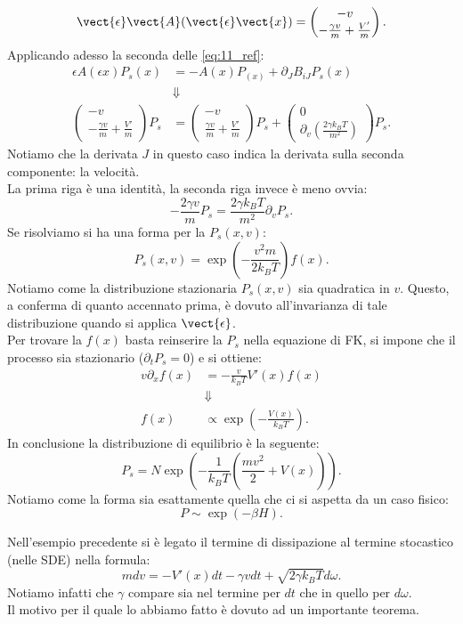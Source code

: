 \begin{exmp}[]
   \[
       \vect{\epsilon}\vect{ A}(\vect{\epsilon}\vect{x})   = \begin{pmatrix} -v \\ -\frac{\gamma v}{m} + \frac{V'}{m} \end{pmatrix} 
   .\] 
   Applicando adesso la seconda delle \ref{eq:11_ref}:
   \[\begin{aligned}
       \epsilon A(\epsilon x) P_s(x) &= - A(x) P_(x) + \partial_{J}B_{iJ}P_s(x) \\
				   & \Downarrow\\
       \begin{pmatrix} -v \\ -\frac{\gamma v}{m} + \frac{V'}{m} \end{pmatrix} P_s &= 
       \begin{pmatrix} -v \\ \frac{\gamma v}{m}+\frac{V'}{m} \end{pmatrix} P_s + 
       \begin{pmatrix} 0 \\ \partial_{v}\left(\frac{2\gamma k_BT}{m^2}\right) \end{pmatrix} P_s
   .\end{aligned}\]
   Notiamo che la derivata $J$ in questo caso indica la derivata sulla seconda componente: la velocità.\\
   La prima riga è una identità, la seconda riga invece è meno ovvia:
   \[
       -\frac{2\gamma v}{m}P_s = \frac{2\gamma k_BT}{m^2}\partial_{v}P_s
   .\] 
   Se risolviamo si ha una forma per la $P_s(x, v)$:
   \[
       P_s(x,v) = \exp\left(-\frac{v^2m}{2k_BT}\right)f(x) 
   .\] 
   Notiamo come la distribuzione stazionaria $P_s(x,v) $ sia quadratica in $v$.
   Questo, a conferma di quanto accennato prima, è dovuto all'invarianza di tale distribuzione quando si applica $\vect{\epsilon }$. \\
   Per trovare la $f(x) $ basta reinserire la $P_s$ nella equazione di FK,  si impone che il processo sia stazionario ($\partial_{t}P_s = 0$) e si ottiene:
   \[\begin{aligned}
       v\partial_{x}f(x) &= - \frac{v}{k_BT}V'(x) f(x) \\
			 &\Downarrow\\
       f(x) &\propto \exp\left(-\frac{V(x)}{k_BT}\right)
   .\end{aligned}\]
   In conclusione la distribuzione di equilibrio è la seguente:
   \[
       P_{s} = N \exp\left(-\frac{1}{k_BT}\left(\frac{mv^2}{2}+V(x)\right)\right)
   .\] 
   Notiamo come la forma sia esattamente quella che ci si aspetta da un caso fisico:
   \[
       P\sim \exp\left(-\beta H\right)
   .\] 
\end{exmp}
\noindent
Nell'esempio precedente si è legato il termine di dissipazione al termine stocastico (nelle SDE) nella formula:
\[
	    mdv = -V'(x) dt - \gamma v dt + \sqrt{2\gamma  k_B T} d\omega
.\] 
Notiamo infatti che $\gamma$ compare sia nel termine per $dt$ che in quello per $d\omega$.\\
Il motivo per il quale lo abbiamo fatto è dovuto ad un importante teorema.

